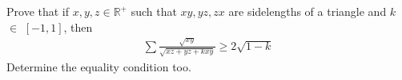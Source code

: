 Prove that if $x,y,z \in \mathbb{R}^+$ such that $xy,yz,zx$ are sidelengths of a triangle and $k$ $\in$ $[-1,1]$, then
\begin{align*} \sum \frac{\sqrt{xy}}{\sqrt{xz+yz+kxy}} \geq 2 \sqrt{1-k} \end{align*}Determine the equality condition too.